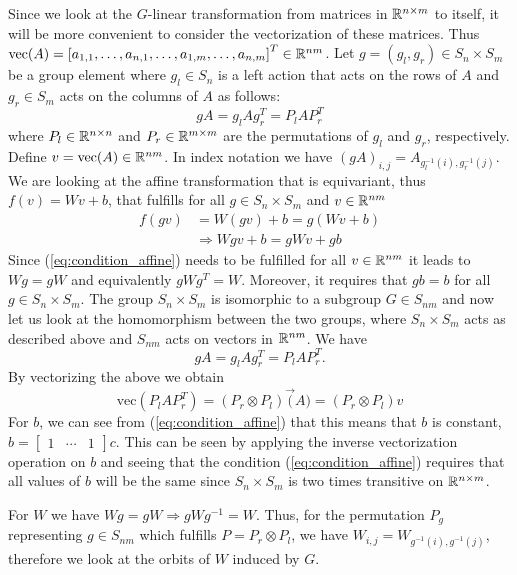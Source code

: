 \documentclass[english]{article}
\begin{document}
\subsection{~}

\label{subsec:q21}


Since we look at the $G$-linear transformation from matrices in $\mathbb{R}^{n\times m}$
to itself, it will be more convenient to consider the vectorization
of these matrices. Thus $\text{vec}(A)=\left[a_{1,1},\ldots,a_{n,1},\ldots,a_{1,m},\ldots,a_{n,m}\right]^{T}\in\mathbb{R}^{nm}$.
Let $g=\left(g_{l},g_{r}\right)\in S_{n}\times S_{m}$ be a group
element where $g_{l}\in S_{n}$ is a left action that acts on the
rows of $A$ and $g_{r}\in S_{m}$ acts on the columns of $A$ as
follows: 
\[
gA=g_{l}Ag_{r}^{T}=P_{l}AP_{r}^{T}
\]
where $P_{l}\in\mathbb{R}^{n\times n}$ and $P_{r}\in\mathbb{R}^{m\times m}$ are
the permutations of $g_{l}$ and $g_{r}$, respectively. Define $v=\text{vec}(A)\in\mathbb{R}^{nm}$.
In index notation we have $\left(gA\right)_{i,j}=A_{g_{l}^{-1}(i),g_{r}^{-1}(j)}$.
We are looking at the affine transformation that is equivariant, thus
$f(v)=Wv+b$, that fulfills for all $g\in S_{n}\times S_{m}$ and
$v\in\mathbb{R}^{nm}$
\begin{align}
f(gv) & =W\left(gv\right)+b=g\left(Wv+b\right)\nonumber \\
 & \Rightarrow Wgv+b=gWv+gb\label{eq:condition_affine}
\end{align}
Since (\ref{eq:condition_affine}) needs to be fulfilled for all $v\in\mathbb{R}^{nm}$
it leads to $Wg=gW$ and equivalently $gWg^{T}=W$. Moreover, it requires
that $gb=b$ for all $g\in S_{n}\times S_{m}$. The group $S_{n}\times S_{m}$
is isomorphic to a subgroup $G\in S_{nm}$ and now let us look at the
homomorphism between the two groups, where $S_{n}\times S_{m}$ acts
as described above and $S_{nm}$ acts on vectors in $\mathbb{R}^{nm}$. We
have 
\[
gA=g_{l}Ag_{r}^{T}=P_{l}AP_{r}^{T}.
\]
By vectorizing the above we obtain 
\[
\text{vec}\left(P_{l}AP_{r}^{T}\right)=\left(P_{r}\otimes P_{l}\right)\vec(A)=\left(P_{r}\otimes P_{l}\right)v
\]
For $b$, we can see from (\ref{eq:condition_affine}) that this means
that $b$ is constant, $b=\left[\begin{array}{ccc}
1 & \cdots & 1\end{array}\right]c$. This can be seen by applying the inverse vectorization operation on $b$
and seeing that the condition (\ref{eq:condition_affine}) requires that
all values of $b$ will be the same since $S_{n}\times S_{m}$ is
two times transitive on $\mathbb{R}^{n\times m}$.

For $W$ we have $Wg=gW\Rightarrow gWg^{-1}=W$. Thus, for the permutation
$P_{g}$ representing $g\in S_{nm}$ which fulfills $P=P_{r}\otimes P_{l}$,
we have $W_{i,j}=W_{g^{-1}(i),g^{-1}(j)}$, therefore we look at
the orbits of $W$ induced by $G$. 
\end{document}
